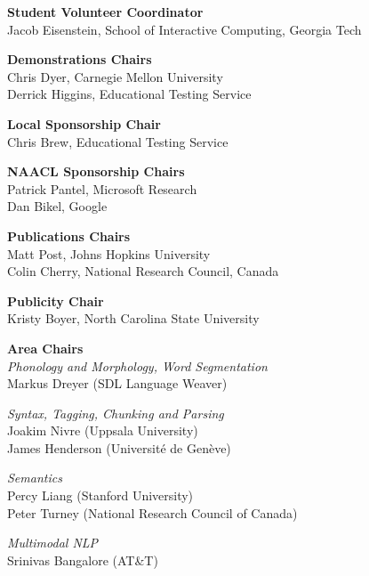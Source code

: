 {\bf Student Volunteer Coordinator} \\
Jacob Eisenstein, School of Interactive Computing, Georgia Tech \\

{\bf Demonstrations Chairs} \\
Chris Dyer, Carnegie Mellon University \\
Derrick Higgins, Educational Testing Service \\

{\bf Local Sponsorship Chair} \\
Chris Brew, Educational Testing Service \\

{\bf NAACL Sponsorship Chairs} \\
Patrick Pantel, Microsoft Research \\
Dan Bikel, Google \\

{\bf Publications Chairs} \\
Matt Post, Johns Hopkins University \\
Colin Cherry, National Research Council, Canada \\

{\bf Publicity Chair} \\
Kristy Boyer, North Carolina State University \\

{\bf Area Chairs} \\
\emph{Phonology and Morphology, Word Segmentation} \\
Markus Dreyer (SDL Language Weaver) \\

\emph{Syntax, Tagging, Chunking and Parsing}	\\
Joakim Nivre (Uppsala University) \\
James Henderson (Université de Genève) \\

\emph{Semantics}	\\
Percy Liang (Stanford University) \\
Peter Turney (National Research Council of Canada) \\

\emph{Multimodal NLP} \\
Srinivas Bangalore (AT\&T) \\

